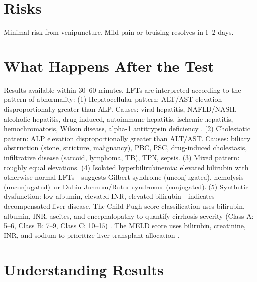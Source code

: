 \section*{Risks}
Minimal risk from venipuncture. Mild pain or bruising resolves in 1--2 days.

\section*{What Happens After the Test}
Results available within 30--60 minutes. LFTs are interpreted according to the pattern of abnormality: (1) Hepatocellular pattern: ALT/AST elevation disproportionally greater than ALP. Causes: viral hepatitis, NAFLD/NASH, alcoholic hepatitis, drug-induced, autoimmune hepatitis, ischemic hepatitis, hemochromatosis, Wilson disease, alpha-1 antitrypsin deficiency \cite{giannini2005liver}. (2) Cholestatic pattern: ALP elevation disproportionally greater than ALT/AST. Causes: biliary obstruction (stone, stricture, malignancy), PBC, PSC, drug-induced cholestasis, infiltrative disease (sarcoid, lymphoma, TB), TPN, sepsis. (3) Mixed pattern: roughly equal elevations. (4) Isolated hyperbilirubinemia: elevated bilirubin with otherwise normal LFTs---suggests Gilbert syndrome (unconjugated), hemolysis (unconjugated), or Dubin-Johnson/Rotor syndromes (conjugated). (5) Synthetic dysfunction: low albumin, elevated INR, elevated bilirubin---indicates decompensated liver disease. The Child-Pugh score classification uses bilirubin, albumin, INR, ascites, and encephalopathy to quantify cirrhosis severity (Class A: 5--6, Class B: 7--9, Class C: 10--15) \cite{pugh1973transection}. The MELD score uses bilirubin, creatinine, INR, and sodium to prioritize liver transplant allocation \cite{kamath2007model}.

\section*{Understanding Results}

